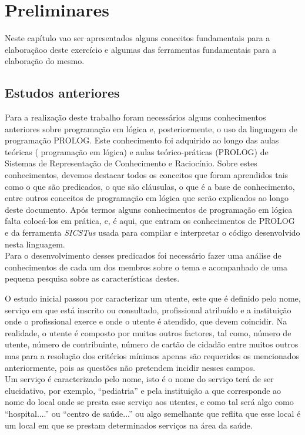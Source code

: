 \chapter{Preliminares}
\label{cap:p2}
Neste capítulo vao ser apresentados alguns conceitos fundamentais para a elaboraçãoo deste
exercício e algumas das ferramentas fundamentais para a elaboração do mesmo.


\section{Estudos anteriores}
\label{p2:estudp}

Para a realização deste trabalho foram necessários alguns conhecimentos anteriores sobre programação em lógica e, posteriormente, o uso da linguagem de programação PROLOG.
Este conhecimento foi adquirido ao longo das aulas teóricas ( programação em lógica) e aulas
teórico-práticas (PROLOG) de Sistemas de Representação de Conhecimento e Raciocínio.
Sobre estes conhecimentos, devemos destacar todos os conceitos que foram aprendidos tais
como o que são predicados, o que são cláusulas, o que é a base de conhecimento, entre outros
conceitos de programação em lógica que serão explicados ao longo deste documento.
Após termos alguns conhecimentos de programação em lógica falta colocá-los em prática,
e, é aqui, que entram os conhecimentos de PROLOG e da ferramenta \textit{SICSTus} usada para
compilar e interpretar o código desenvolvido nesta linguagem.
\\


Para o desenvolvimento desses predicados foi necessário fazer uma análise de conhecimentos de cada um dos membros sobre o tema e acompanhado de uma pequena pesquisa sobre as características destes.

O estudo inicial passou por caracterizar um utente, este que é definido pelo nome, serviço em que está inscrito ou consultado, profissional atribuído e a instituição onde o profissional exerce e onde o utente é atendido, que devem coincidir. Na realidade, o utente é composto por muitos outros factores, tal como, número de utente, número de contribuinte, número de cartão de cidadão entre muitos outros mas para a resolução dos critérios mínimos apenas são requeridos os mencionados anteriormente, pois as questões não pretendem incidir nesses campos.
\\

Um serviço é caracterizado pelo nome, isto é o nome do serviço terá de ser elucidativo, por exemplo, “pediatria” e pela instituição a que corresponde ao nome do local onde se presta esse serviço aos utentes, e como tal será algo como “hospital....” ou “centro de saúde...” ou algo semelhante que reflita que esse local é um local em que se prestam determinados serviços na área da saúde.
\\

